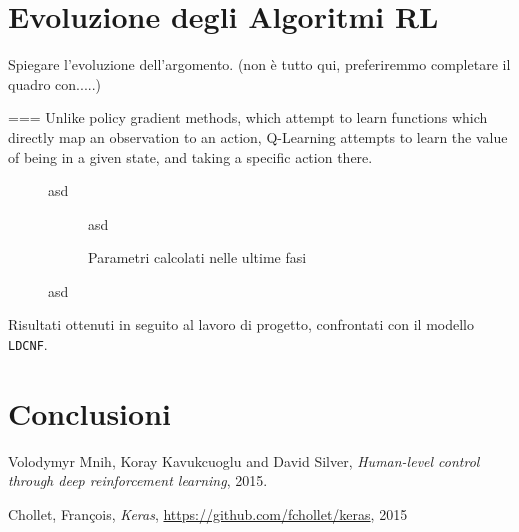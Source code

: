 \documentclass[twoside,twocolumn,10pt]{extarticle}
\theoremstyle{definition}
\begin{document}
\section{Evoluzione degli Algoritmi RL}\label{sec:evoalg}
	Spiegare l'evoluzione dell'argomento. (non è tutto qui, preferiremmo completare il quadro con.....)
	
	===
	Unlike policy gradient methods, which attempt to learn functions which directly map an observation to an action, Q-Learning attempts to learn the value of being in a given state, and taking a specific action there.

	\begin{figure}[h]
		\centering
		\caption{asd}
		\label{fig:unroll}
	\end{figure}

	\begin{figure}[h]
		\centering
		\begin{subfigure}[b]{.496\textwidth}
			\caption{asd}
		\end{subfigure}
		\begin{subfigure}[b]{.496\textwidth}
			\caption{Parametri calcolati nelle ultime fasi}
		\end{subfigure}
		\caption{asd}
		\label{fig:parmap}
	\end{figure}
	
	\begin{table}[]
		\centering
		\caption{Risultati ottenuti in seguito al lavoro di progetto, confrontati con il modello \texttt{LDCNF}.}
		\label{tab:results}
		
	\end{table}
	
	\section{Conclusioni}	
	
\begin{thebibliography}{99}	
		Volodymyr Mnih, Koray Kavukcuoglu and David Silver,
		\newblock \emph{Human-level control through deep reinforcement learning},
		2015.
		
		Chollet, Fran\c{c}ois,
		\newblock \emph{Keras},
		\url{https://github.com/fchollet/keras},
		2015

\end{thebibliography}
\end{document}
